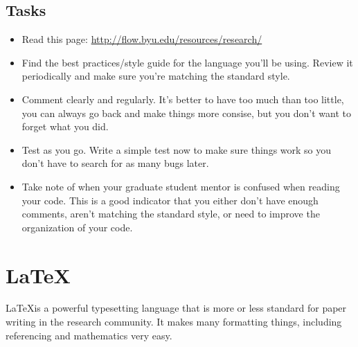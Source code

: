 \documentclass[]{article}%
\begin{document}
\subsection{Tasks}
\begin{itemize}
	\item Read this page: \url{http://flow.byu.edu/resources/research/}
	\item Find the best practices/style guide for the language you'll be using. Review it periodically and make sure you're matching the standard style.
	\item Comment clearly and regularly.  It's better to have too much than too little, you can always go back and make things more consise, but you don't want to forget what you did.
	\item Test as you go.  Write a simple test now to make sure things work so you don't have to search for as many bugs later.
	\item Take note of when your graduate student mentor is confused when reading your code. This is a good indicator that you either don't have enough comments, aren't matching the standard style, or need to improve the organization of your code.
\end{itemize}


\section{\LaTeX}
\LaTeX is a powerful typesetting language that is more or less standard for paper writing in the research community.  It makes many formatting things, including referencing and mathematics very easy.
\end{document}
